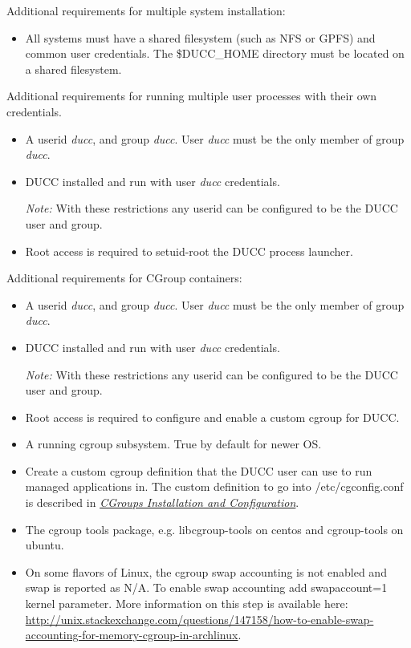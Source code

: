 Additional requirements for multiple system installation:

\begin{itemize}
  \item All systems must have a shared filesystem (such as NFS or GPFS) and common user credentials.
        The \$DUCC\_HOME directory must be located on a shared filesystem.
\end{itemize}
  
Additional requirements for running multiple user processes with their own credentials.

\begin{itemize}
  \item A userid {\em ducc}, and group {\em ducc}.  User {\em ducc} must be the only member of group {\em ducc}.
  \item DUCC installed and run with user {\em ducc} credentials.
  
    {\em Note:} With these restrictions any userid can be configured to be the DUCC user and group.
  
  \item Root access is required to setuid-root the DUCC process launcher.
\end{itemize}
  
Additional requirements for CGroup containers:

\begin{itemize}
  \item A userid {\em ducc}, and group {\em ducc}.  User {\em ducc} must be the only member of group {\em ducc}.
  \item DUCC installed and run with user {\em ducc} credentials.
  
    {\em Note:} With these restrictions any userid can be configured to be the DUCC user and group.
  
  \item Root access is required to configure and enable a custom cgroup for DUCC.
  \item A running cgroup subsystem. True by default for newer OS.
  \item Create a custom cgroup definition that the DUCC user can use to run managed applications in. 
  The custom definition to go into /etc/cgconfig.conf is described in \hyperref[subsec:cgroup.configure]{\em  CGroups Installation and Configuration}.
  \item The cgroup tools package, e.g. libcgroup-tools on centos and cgroup-tools on ubuntu. 
  \item On some flavors of Linux, the cgroup swap accounting is not enabled and swap is reported as N/A. 
  To enable swap accounting add swapaccount=1 kernel parameter. 
  More information on this step is available here: \url{http://unix.stackexchange.com/questions/147158/how-to-enable-swap-accounting-for-memory-cgroup-in-archlinux}.  
\end{itemize}

